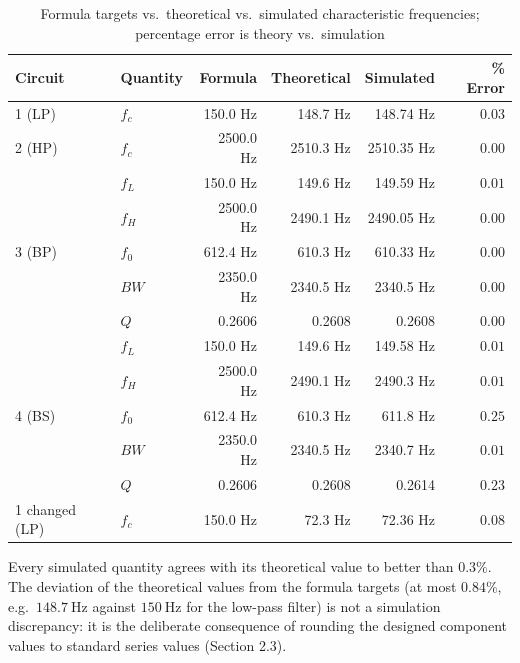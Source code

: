 \documentclass[12pt,a4paper]{article}
\begin{document}
	\begin{table}[H]
		\centering
		\caption{Formula targets vs.\ theoretical vs.\ simulated characteristic
			frequencies; percentage error is theory vs.\ simulation}
		\label{tab:compare}
		\small
		\renewcommand{\arraystretch}{1.25}
		\begin{tabular}{|l|l|r|r|r|r|}
			\hline
			\rowcolor{black!12}\textbf{Circuit} & \textbf{Quantity} & \textbf{Formula} & \textbf{Theoretical} &
			\textbf{Simulated} & \textbf{\% Error} \\
			\hline
			1 (LP) & $f_c$ & 150.0 Hz & 148.7 Hz & 148.74 Hz & $0.03$ \\
			\hline
			2 (HP) & $f_c$ & 2500.0 Hz & 2510.3 Hz & 2510.35 Hz & $0.00$ \\
			\hline
			\multirow{5}{*}{3 (BP)}
			& $f_L$ & 150.0 Hz & 149.6 Hz & 149.59 Hz & $0.01$ \\
			\cline{2-6}
			& $f_H$ & 2500.0 Hz & 2490.1 Hz & 2490.05 Hz & $0.00$ \\
			\cline{2-6}
			& $f_0$ & 612.4 Hz & 610.3 Hz & 610.33 Hz & $0.00$ \\
			\cline{2-6}
			& $BW$ & 2350.0 Hz & 2340.5 Hz & 2340.5 Hz & $0.00$ \\
			\cline{2-6}
			& $Q$ & 0.2606 & 0.2608 & 0.2608 & $0.00$ \\
			\hline
			\multirow{5}{*}{4 (BS)}
			& $f_L$ & 150.0 Hz & 149.6 Hz & 149.58 Hz & $0.01$ \\
			\cline{2-6}
			& $f_H$ & 2500.0 Hz & 2490.1 Hz & 2490.3 Hz & $0.01$ \\
			\cline{2-6}
			& $f_0$ & 612.4 Hz & 610.3 Hz & 611.8 Hz & $0.25$ \\
			\cline{2-6}
			& $BW$ & 2350.0 Hz & 2340.5 Hz & 2340.7 Hz & $0.01$ \\
			\cline{2-6}
			& $Q$ & 0.2606 & 0.2608 & 0.2614 & $0.23$ \\
			\hline
			1 changed (LP) & $f_c$ & 150.0 Hz & 72.3 Hz & 72.36 Hz & $0.08$ \\
			\hline
		\end{tabular}
	\end{table}
	Every simulated quantity agrees with its theoretical value to better
	than $0.3\%$. The deviation of the theoretical values from the
	formula targets (at most $0.84\%$, e.g.\ $148.7\ \mathrm{Hz}$ against
	$150\ \mathrm{Hz}$ for the low-pass filter) is not a simulation
	discrepancy: it is the deliberate consequence of rounding the designed
	component values to standard series values (Section 2.3).
	
\end{document}

